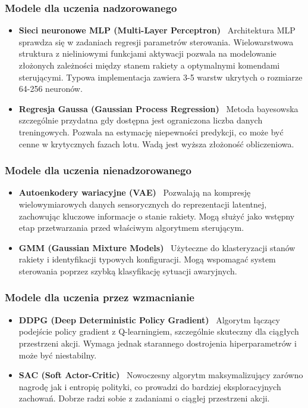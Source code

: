 \subsubsection{Modele dla uczenia nadzorowanego}
\begin{itemize}
\item \textbf{Sieci neuronowe MLP (Multi-Layer Perceptron)} \
Architektura MLP sprawdza się w zadaniach regresji parametrów sterowania. Wielowarstwowa struktura z nieliniowymi funkcjami aktywacji pozwala na modelowanie złożonych zależności między stanem rakiety a optymalnymi komendami sterującymi. Typowa implementacja zawiera 3-5 warstw ukrytych o rozmiarze 64-256 neuronów.

\item \textbf{Regresja Gaussa (Gaussian Process Regression)} \
Metoda bayesowska szczególnie przydatna gdy dostępna jest ograniczona liczba danych treningowych. Pozwala na estymację niepewności predykcji, co może być cenne w krytycznych fazach lotu. Wadą jest wyższa złożoność obliczeniowa.
\end{itemize}

\subsubsection{Modele dla uczenia nienadzorowanego}
\begin{itemize}
\item \textbf{Autoenkodery wariacyjne (VAE)} \
Pozwalają na kompresję wielowymiarowych danych sensorycznych do reprezentacji latentnej, zachowując kluczowe informacje o stanie rakiety. Mogą służyć jako wstępny etap przetwarzania przed właściwym algorytmem sterującym.

\item \textbf{GMM (Gaussian Mixture Models)} \
Użyteczne do klasteryzacji stanów rakiety i identyfikacji typowych konfiguracji. Mogą wspomagać system sterowania poprzez szybką klasyfikację sytuacji awaryjnych.
\end{itemize}

\subsubsection{Modele dla uczenia przez wzmacnianie \cite{sutton2018reinforcement}}
\begin{itemize}
\item \textbf{DDPG (Deep Deterministic Policy Gradient)} \
Algorytm łączący podejście policy gradient z Q-learningiem, szczególnie skuteczny dla ciągłych przestrzeni akcji. Wymaga jednak starannego dostrojenia hiperparametrów i może być niestabilny.

\item \textbf{SAC (Soft Actor-Critic)} \
Nowoczesny algorytm maksymalizujący zarówno nagrodę jak i entropię polityki, co prowadzi do bardziej eksploracyjnych zachowań. Dobrze radzi sobie z zadaniami o ciągłej przestrzeni akcji.
\end{itemize}


